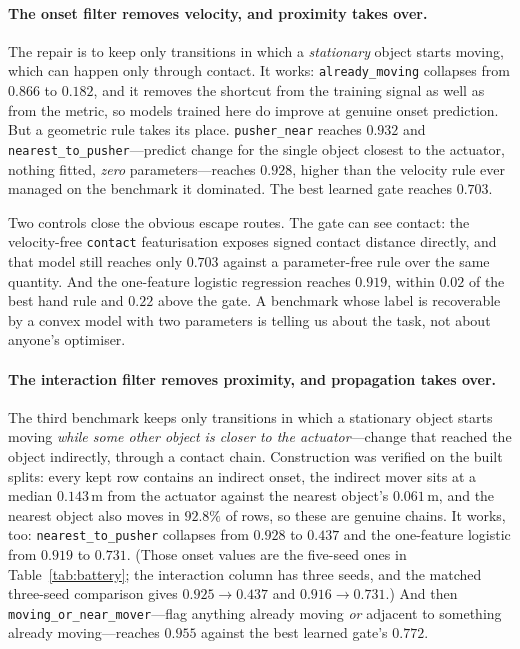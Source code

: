 \documentclass{article}
\begin{document}
\paragraph{The onset filter removes velocity, and proximity takes over.} The repair is to keep
only transitions in which a \emph{stationary} object starts moving, which can happen only
through contact. It works: \texttt{already\_moving} collapses from $0.866$ to $0.182$, and it
removes the shortcut from the training signal as well as from the metric, so models trained
here do improve at genuine onset prediction. But a geometric rule takes its place.
\texttt{pusher\_near} reaches $0.932$ and \texttt{nearest\_to\_pusher}---predict change for the
single object closest to the actuator, nothing fitted, \emph{zero} parameters---reaches
$0.928$, higher than the velocity rule ever managed on the benchmark it dominated. The best
learned gate reaches $0.703$.

Two controls close the obvious escape routes. The gate can see contact: the velocity-free
\texttt{contact} featurisation exposes signed contact distance directly, and that model still
reaches only $0.703$ against a parameter-free rule over the same quantity. And the one-feature
logistic regression reaches $0.919$, within $0.02$ of the best hand rule and $0.22$ above the
gate. A benchmark whose label is recoverable by a convex model with two parameters is telling
us about the task, not about anyone's optimiser.

\paragraph{The interaction filter removes proximity, and propagation takes over.} The third
benchmark keeps only transitions in which a stationary object starts moving \emph{while some
other object is closer to the actuator}---change that reached the object indirectly, through a
contact chain. Construction was verified on the built splits: every kept row contains an
indirect onset, the indirect mover sits at a median $0.143$\,m from the actuator against the
nearest object's $0.061$\,m, and the nearest object also moves in $92.8\%$ of rows, so these
are genuine chains. It works, too: \texttt{nearest\_to\_pusher} collapses from $0.928$ to
$0.437$ and the one-feature logistic from $0.919$ to $0.731$. (Those onset values are the
five-seed ones in Table~\ref{tab:battery}; the interaction column has three seeds, and the
matched three-seed comparison gives $0.925 \rightarrow 0.437$ and $0.916 \rightarrow 0.731$.)
And then
\texttt{moving\_or\_near\_mover}---flag anything already moving \emph{or} adjacent to something
already moving---reaches $0.955$ against the best learned gate's $0.772$.
\end{document}
